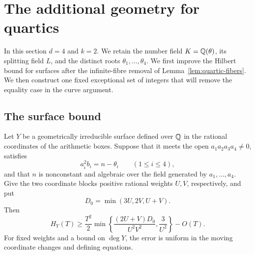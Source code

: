 \section{The additional geometry for quartics}
\label{sec:quartic-geometry}

In this section $d=4$ and $k=2$.  We retain the number field
$K=\mathbb Q(\theta)$, its splitting field $L$, and the distinct roots
$\theta_1,\ldots,\theta_4$.  We first improve the Hilbert bound for
surfaces after the infinite-fibre removal of
Lemma~\ref{lem:quartic-fibers}.  We then construct one fixed exceptional
set of integers that will remove the equality case in the curve argument.

\subsection{The surface bound}

\begin{proposition}\label{prop:quartic-surface}
Let $Y$ be a geometrically irreducible surface defined over $\mathbb Q$ in the
rational coordinates of the arithmetic boxes.  Suppose that it meets the open
$a_1a_2a_3a_4\ne0$, satisfies
\[
 a_i^2b_i=n-\theta_i\qquad(1\le i\le4),
\]
and that $n$ is nonconstant and algebraic over the field generated by
$a_1,\ldots,a_4$.
Give the two coordinate blocks positive rational weights $U,V$,
respectively, and put
\[
 D_0=\min(3U,2V,U+V).
\]
Then
\begin{equation}\label{eq:quartic-surface-hilbert}
 H_Y(T)\ge \frac{T^2}{2}
    \min\left\{\frac{(2U+V)D_0}{U^2V^2},\frac3{U^2}\right\}-O(T).
\end{equation}
For fixed weights and a bound on $\deg Y$, the error is uniform in the
moving coordinate changes and defining equations.
\end{proposition}

